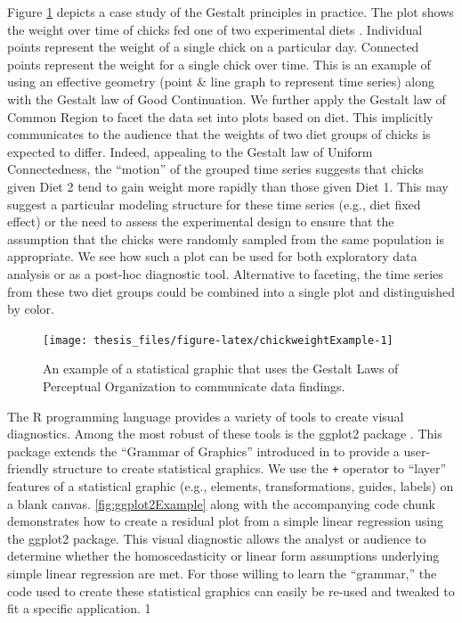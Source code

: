 \documentclass[11pt,]{isuthesis}
\begin{document}
Figure \ref{fig:chickweightExample} depicts a case study of the Gestalt principles in practice.
The plot shows the weight over time of chicks fed one of two experimental diets \citep{crowder1990analysis}.
Individual points represent the weight of a single chick on a particular day.
Connected points represent the weight for a single chick over time.
This is an example of using an effective geometry (point \& line graph to represent time series) along with the Gestalt law of Good Continuation.
We further apply the Gestalt law of Common Region to facet the data set into plots based on diet.
This implicitly communicates to the audience that the weights of two diet groups of chicks is expected to differ.
Indeed, appealing to the Gestalt law of Uniform Connectedness, the ``motion'' of the grouped time series suggests that chicks given Diet 2 tend to gain weight more rapidly than those given Diet 1.
This may suggest a particular modeling structure for these time series (e.g., diet fixed effect) or the need to assess the experimental design to ensure that the assumption that the chicks were randomly sampled from the same population is appropriate.
We see how such a plot can be used for both exploratory data analysis or as a post-hoc diagnostic tool.
Alternative to faceting, the time series from these two diet groups could be combined into a single plot and distinguished by color.

\begin{figure}[!htbp]

{\centering \texttt{[image: thesis\_files/figure-latex/chickweightExample-1]} 

}

\caption{An example of a statistical graphic that uses the Gestalt Laws of Perceptual Organization to communicate data findings.}\label{fig:chickweightExample}
\end{figure}

The R programming language \citep{r} provides a variety of tools to create visual diagnostics.
Among the most robust of these tools is the ggplot2 package \citep{ggplot2}.
This package extends the ``Grammar of Graphics'' introduced in \citet{Wilkinson2005} to provide a user-friendly structure to create statistical graphics.
We use the \texttt{+} operator to ``layer'' features of a statistical graphic (e.g., elements, transformations, guides, labels) on a blank canvas.
\ref{fig:ggplot2Example} along with the accompanying code chunk demonstrates how to create a residual plot from a simple linear regression using the ggplot2 package.
This visual diagnostic allows the analyst or audience to determine whether the homoscedasticity or linear form assumptions underlying simple linear regression are met.
For those willing to learn the ``grammar,'' the code used to create these statistical graphics can easily be re-used and tweaked to fit a specific application.
1
\end{document}
